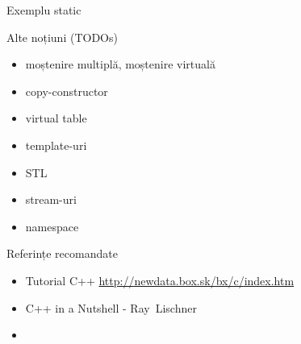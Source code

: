 \documentclass{beamer}
\begin{document}
\begin{frame}{Exemplu static}
	\footnotesize{}
\end{frame}

\begin{frame}{Alte noțiuni (TODOs)}
  \begin{itemize}
  \item moștenire multiplă, moștenire virtuală
  \item copy-constructor
  \item virtual table
  \item template-uri
  \item STL 
  \item stream-uri
  \item namespace
  \end{itemize}
\end{frame}

\begin{frame}{Referințe recomandate}
  \begin{itemize}
  \item Tutorial C++ \url{http://newdata.box.sk/bx/c/index.htm}
  \item C++ in a Nutshell - Ray Lischner
  \item 
  \end{itemize}
\end{frame}
\end{document}
